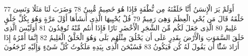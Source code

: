 \documentclass[20pt,a4paper]{article}
\begin{document}
{\tiny\colorbox{cl_aya}{77}} أَوَلَمْ يَرَ الْإِنسَنُ أَنَّا خَلَقْنَهُ مِن نُّطْفَةٍ فَإِذَا هُوَ خَصِيمٌ مُّبِينٌ
{\tiny\colorbox{cl_aya}{78}} وَضَرَبَ لَنَا مَثَلًا وَنَسِىَ خَلْقَهُ قَالَ مَن يُحْىِ الْعِظَمَ وَهِىَ رَمِيمٌ
{\tiny\colorbox{cl_aya}{79}} قُلْ يُحْيِيهَا الَّذِى أَنشَأَهَا أَوَّلَ مَرَّةٍ وَهُوَ بِكُلِّ خَلْقٍ عَلِيمٌ
{\tiny\colorbox{cl_aya}{80}} الَّذِى جَعَلَ لَكُم مِّنَ الشَّجَرِ الْأَخْضَرِ نَارًا فَإِذَا أَنتُم مِّنْهُ تُوقِدُونَ
{\tiny\colorbox{cl_aya}{81}} أَوَلَيْسَ الَّذِى خَلَقَ السَّمَوَتِ وَالْأَرْضَ بِقَدِرٍ عَلَى أَن يَخْلُقَ مِثْلَهُم بَلَى وَهُوَ الْخَلَّقُ الْعَلِيمُ
{\tiny\colorbox{cl_aya}{82}} إِنَّمَا أَمْرُهُ إِذَا أَرَادَ شَئًْا أَن يَقُولَ لَهُ كُن فَيَكُونُ
{\tiny\colorbox{cl_aya}{83}} فَسُبْحَنَ الَّذِى بِيَدِهِ مَلَكُوتُ كُلِّ شَىْءٍ وَإِلَيْهِ تُرْجَعُونَ
\end{document}
